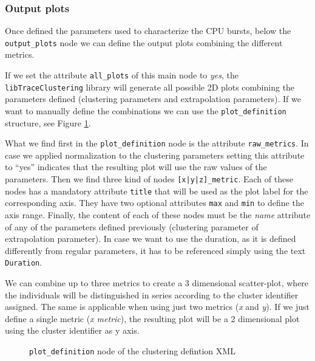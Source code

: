 \documentclass[twoside,a4,english,11pt]{book}
\begin{document}
\subsubsection{Output plots}

Once defined the parameters used to characterize the CPU bursts, below
the \texttt{output\_plots} node we can define the output plots combining
the different metrics.

If we set the attribute \texttt{all\_plots} of this main node to \textit{yes},
the \texttt{libTrace\-Clustering} library will generate all possible 2D plots
combining the parameters defined (clustering parameters and extrapolation
parameters). If we want to manually define the combinations we can use 
the \texttt{plot\_definition} structure, see Figure \ref{fig:xml_plot_definition}.

What we find first in the \texttt{plot\_definition} node is the attribute
\texttt{raw\_metrics}. In case we applied normalization to the clustering
parameters setting this attribute to ``yes'' indicates that the resulting
plot will use the raw values of the parameters. Then we find three kind
of nodes \texttt{[x|y|z]\_metric}. Each of these nodes has a mandatory
attribute \texttt{title} that will be used as the plot label for the
corresponding axis. They have two optional attributes \texttt{max} and
\texttt{min} to define the axis range. Finally, the content of each of
these nodes must be the \textit{name} attribute of any of the parameters 
defined previously (clustering parameter of extrapolation parameter). In case
we want to use the duration, as it is defined differently from regular
parameters, it has to be referenced simply using the text \texttt{Duration}.

We can combine up to three metrics to create a 3 dimensional scatter-plot,
where the individuals will be distinguished in series according to the
cluster identifier assigned. The same is applicable when using just two
metrics (\textit{x} and \textit{y}). If we just define a single metric 
(\textit{x metric}), the resulting plot will be a 2 dimensional plot using
the cluster identifier as y axis.

\begin{figure}
  \centering
  \caption{\texttt{plot\_definition} node of the clustering defintion XML}
  \label{fig:xml_plot_definition}
\end{figure}

% 

\end{document}

